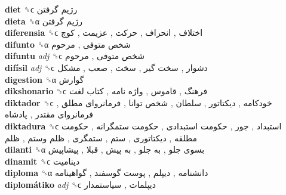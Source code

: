 \textbf{diet} ␝ϲ   رژیم گرفتن   \\
\textbf{dieta} ␝α   رژیم گرفتن   \\
\textbf{diferensia} ␝ϲ   اختلاف ,  انحراف ,  حرکت ,  عزیمت ,  کوچ   \\
\textbf{difunto} ␝α   شخص متوفی ,  مرحوم   \\
\textbf{difuntu} \emph{adj}  ␝ϲ   شخص متوفی ,  مرحوم   \\
\textbf{difísil} \emph{adj}  ␝ϲ   دشوار ,  سخت گیر ,  سخت ,  صعب ,  مشکل   \\
\textbf{digestion} ␝α   گوارش   \\
\textbf{dikshonario} ␝ϲ   فرهنگ ,  قاموس ,  واژه نامه ,  کتاب لغت   \\
\textbf{diktador} ␝ϲ   خودکامه ,  دیکتاتور ,  سلطان ,  شخص توانا ,  فرمانروای مطلق ,  فرمانروای مقتدر ,  پادشاه   \\
\textbf{diktadura} ␝ϲ   استبداد ,  جور ,  حکومت استبدادی ,  حکومت ستمگرانه ,  حکومت مطلقه ,  دیکتاتوری ,  ستم ,  ستمگری ,  ظلم وستم ,  ظلم   \\
\textbf{dilanti} ␝α   بسوی جلو ,  به جلو ,  به پیش ,  قبلا ,  پیشاپیش   \\
\textbf{dinamit} ␝ϲ   دینامیت   \\
\textbf{diploma} ␝α   دانشنامه ,  دیپلم ,  پوست گوسفند ,  گواهینامه   \\
\textbf{diplomátiko} \emph{adj}  ␝ϲ   دیپلمات ,  سیاستمدار   \\
